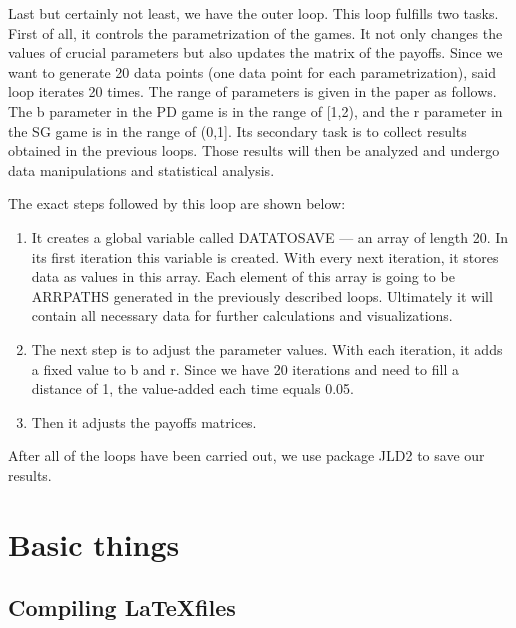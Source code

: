 \documentclass[english, twoside, 12pt, a4paper]{article}
\theoremstyle{definition}
\theoremstyle{plain}
\theoremstyle{remark}
\begin{document}
Last but certainly not least, we have the outer loop. This loop fulfills two tasks. First of all, it controls the parametrization of the games. It not only changes the values
of crucial parameters but also updates the matrix of the payoffs. Since we want to generate 20 data points (one data point for each parametrization), said loop iterates 20 times. 
The range of parameters is given in the paper as follows. The b parameter in the PD game is in the range of [1,2), and the r parameter in the SG game is in the range of (0,1]. Its secondary task is to collect results obtained in the previous loops. Those results will then be analyzed and undergo data manipulations and statistical analysis.

The exact steps followed by this loop are shown below:

\begin{enumerate}
  \item It creates a global variable called DATATOSAVE --- an array of length 20. In its first iteration this variable is created. With every next iteration, it stores data as values in this array. Each element of this array is going to be ARRPATHS generated in the previously described loops. Ultimately it will contain all necessary data for further calculations and visualizations.
  \item The next step is to adjust the parameter values. With each iteration, it adds a fixed value to b and r. Since we have 20 iterations and need to fill a distance of 1, the value-added each time equals 0.05.
  \item Then it adjusts the payoffs matrices.
\end{enumerate}

After all of the loops have been carried out, we use package JLD2 to save our results. 


\clearpage
\section{Basic things}

\subsection{Compiling \LaTeX files}
\end{document}
